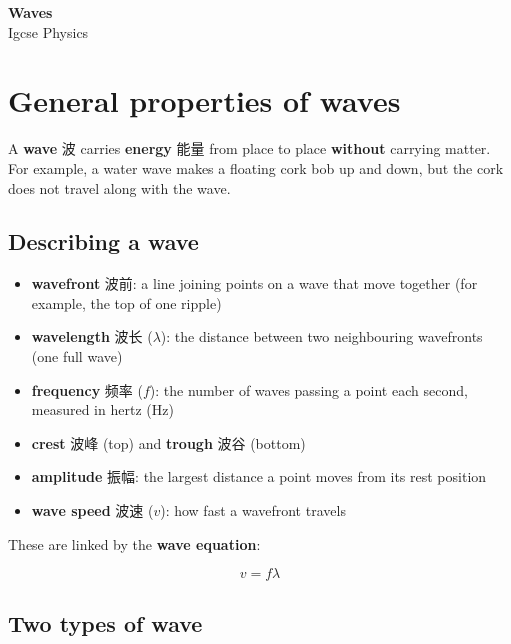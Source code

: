 \documentclass[11pt]{article}
\begin{document}
\begin{center}
  {\LARGE\bfseries Waves}\\[0.35em]
  {\large Igcse Physics}
\end{center}
\vspace{0.6em}

\section*{General properties of waves}

A \textbf{wave} 波 carries \textbf{energy} 能量 from place to place \textbf{without} carrying matter. For example, a water wave makes a floating cork bob up and down, but the cork does not travel along with the wave.

\subsection*{Describing a wave}

\begin{itemize}
\item \textbf{wavefront} 波前: a line joining points on a wave that move together (for example, the top of one ripple)

\item \textbf{wavelength} 波长 ($\lambda$): the distance between two neighbouring wavefronts (one full wave)

\item \textbf{frequency} 频率 ($f$): the number of waves passing a point each second, measured in hertz (Hz)

\item \textbf{crest} 波峰 (top) and \textbf{trough} 波谷 (bottom)

\item \textbf{amplitude} 振幅: the largest distance a point moves from its rest position

\item \textbf{wave speed} 波速 ($v$): how fast a wavefront travels

\end{itemize}

These are linked by the \textbf{wave equation}:

\[
v = f\lambda
\]

\subsection*{Two types of wave}
\end{document}
